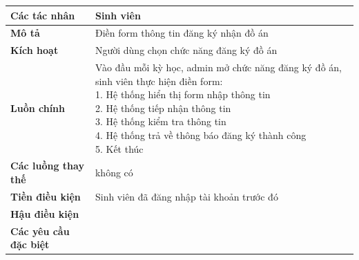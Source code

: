 \begin{tabular}{|l|l|}
	\hline
	\textbf{Các tác nhân}         & Sinh viên                                                                                         \\
	\hline
	\textbf{Mô tả}                & Điền form thông tin đăng ký nhận đồ án                                                            \\
	\hline
	\textbf{Kích hoạt}            & Người dùng chọn chức năng đăng ký đồ án                                                           \\
	\hline
	\textbf{Luồn chính}           & \makecell[l]{Vào đầu mỗi kỳ học, admin mở chức năng đăng ký đồ án, sinh viên thực hiện điền form: \\ 1. Hệ thống hiển thị form nhập thông tin \\ 2. Hệ thống tiếp nhận thông tin \\ 3. Hệ thống kiểm tra thông tin \\ 4. Hệ thống trả về thông báo đăng ký thành công \\ 5. Kết thúc} \\
	\hline
	\textbf{Các luồng thay thế}   & không có                                                                                          \\
	\hline
	\textbf{Tiền điều kiện}       & Sinh viên đã đăng nhập tài khoản trước đó                                                         \\
	\hline
	\textbf{Hậu điều kiện}        &                                                                                                   \\
	\hline
	\textbf{Các yêu cầu đặc biệt} &                                                                                                   \\
	\hline
\end{tabular}

